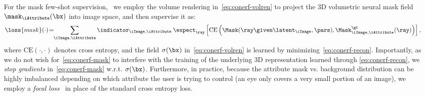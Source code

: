     For the mask few-shot supervision, \
    we employ the volume rendering in~\cref{eq:conerf-volren} to project the 3D volumetric neural mask field $\mask_\iAttribute(\bx)$ into image space, and then supervise it as:
    \newcommand{\crossentropy}[2]{\text{CE}\left(#1,#2\right)}
    \begin{equation}
      \loss{mask}(\cdot) \!= \!\!\sum_{\iImage, \iAttribute}
      \indicator_{\iImage, \iAttribute} \:
      \expect_\ray
      \left[
        \crossentropy
        {\Mask(\ray \given \latent_\iImage, \pars)}
        {\Mask^\gt_{\iImage, \iAttribute}(\ray)}
        \right]
      ,
      \label{eq:conerf-mask}
    \end{equation}
    where $\crossentropy{\cdot}{\cdot}$ denotes cross entropy, and the field $\sigma(\bx)$ in~\cref{eq:conerf-volren} is learned by minimizing~\cref{eq:conerf-recon}.
    Importantly, as we do not wish for~\cref{eq:conerf-mask} to interfere with the
    training of the underlying 3D representation learned through
    \cref{eq:conerf-recon}, we \textit{stop gradients} in~\cref{eq:conerf-mask}
    w.r.t. $\sigma(\bx)$.
    Furthermore, in practice, because the attribute mask vs.
    background distribution can be highly imbalanced depending on which attribute the user is trying to control (\eg an eye only covers a very small portion of an image), we employ a \textit{focal loss}~\cite{lin2017focal} in place of the standard cross entropy loss.

